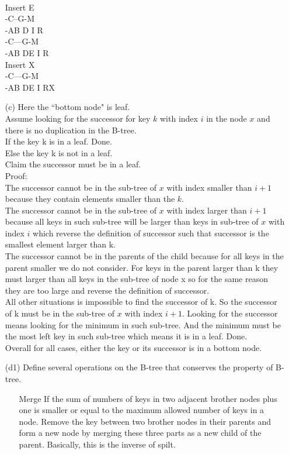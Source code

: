 \documentclass[10pt,twoside,a4paper]{article}
\begin{document}
\begin{itemize}
\\Insert E
\\-\hspace{0.4cm}C--G-M
\\-AB  D  I  R
\\-\hspace{0.4cm}C---G-M
\\-AB  DE  I  R
\\Insert X
\\-\hspace{0.4cm}C---G-M
\\-AB  DE  I  RX
\item[(c)]
Here the ``bottom node" is leaf.
\\Assume looking for the successor for key $k$ with index $i$ in the node $x$ and there is no duplication in the B-tree.
\\If the key k is in a leaf. Done.
\\Else the key k is not in a leaf. 
\\Claim the successor must be in a leaf.
\\Proof:
\\The successor cannot be in the sub-tree of $x$ with index smaller than $i+1$ because they contain elements smaller than the $k$.
\\The successor cannot be in the sub-tree of $x$ with index larger than $i+1$ because all keys in such sub-tree will be larger than keys in sub-tree of $x$ with index $i$ which reverse the definition of successor such that successor is the smallest element larger than k.
\\The successor cannot be in the parents of the child because for all keys in the parent smaller we do not consider. For keys in the parent larger than k they must larger than all keys in the sub-tree of node x so for the same reason they are too large and reverse the definition of successor.
\\All other situations is impossible to find the successor of k.  So the successor of k must be in the sub-tree of $x$ with index $i+1$. Looking for the successor means looking for the minimum in such sub-tree. And the minimum must be the most left key in such sub-tree which means it is in a leaf. Done.
\\Overall for all cases, either the key or its successor is in a bottom node.
\item[(d1)]
Define several operations on the B-tree that conserves the property of B-tree.
\begin{itemize}
\item[Merge] If the sum of numbers of keys in two adjacent brother nodes plus one is smaller or equal to the maximum allowed number of keys in a node. Remove the key between two brother nodes in their parents and form a new node by merging these three parts as a new child of the parent. Basically, this is the inverse of spilt.

\end{itemize}
\end{itemize}
\end{document}
